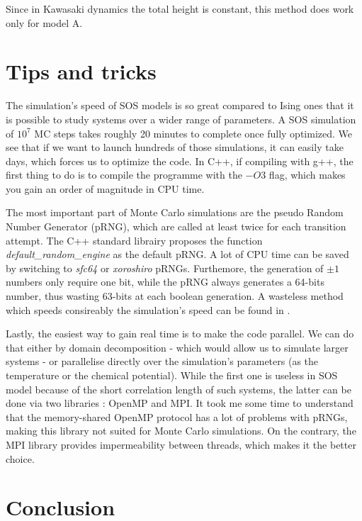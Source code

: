 Since in Kawasaki dynamics the total height is constant, this method does work only for model A.

    \section{Tips and tricks}

    The simulation's speed of SOS models is so great compared to Ising ones that it is possible to study systems over a wider range of parameters. A SOS simulation of $10^7$ MC steps takes roughly 20 minutes to complete once fully optimized. We see that if we want to launch hundreds of those simulations, it can easily take days, which forces us to optimize the code.
    In C++, if compiling with g++, the first thing to do is to compile the programme with the $-O3$ flag, which makes you gain an order of magnitude in CPU time.
    
    The most important part of Monte Carlo simulations are the pseudo Random Number Generator (pRNG), which are called at least twice for each transition attempt.  The C++ standard librairy proposes the function  \textit{default\_random\_engine} as the default pRNG. A lot of CPU time can be saved by switching to \textit{sfc64} or \textit{xoroshiro} pRNGs. Furthemore, the generation of $\pm1$ numbers only require one bit, while the pRNG always generates a 64-bits number, thus wasting 63-bits at each boolean generation. A wasteless method which speeds consireably the simulation's speed can be found in \cite{martin_ankerl_fast_nodate}.
    
    Lastly, the easiest way to gain real time is to make the code parallel. We can do that either by domain decomposition - which would allow us to simulate larger systems - or parallelise directly over the simulation's parameters (as the temperature or the chemical potential). While the first one is useless in SOS model because of the short correlation length of such systems, the latter can be done via two libraries : OpenMP and MPI. It took me some time to understand that the memory-shared OpenMP protocol has a lot of problems with pRNGs, making this library not suited for Monte Carlo simulations. On the contrary, the MPI library provides impermeability between threads, which makes it the better choice.
		
\section{Conclusion}

